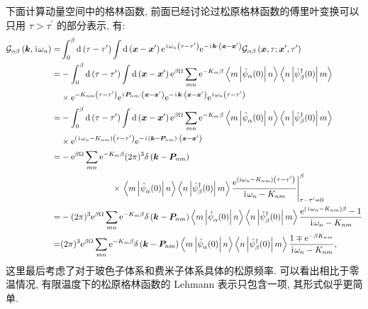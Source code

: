 下面计算动量空间中的格林函数, 前面已经讨论过松原格林函数的傅里叶变换可以只用 $\tau>\tau^{\prime}$ 的部分表示, 有:
\begin{align}
\mathcal{G}_{\alpha \beta}\left(\boldsymbol{k}, \hspace{0.1em}\mathrm{i}\hspace{0.1em} \omega_n\right)=&\int_0^\beta \mathrm{d}\left(\tau-\tau^{\prime}\right) \int \mathrm{d}\left(\boldsymbol{x}-\boldsymbol{x}^{\prime}\right)\mathrm{e}^{\hspace{0.1em}\mathrm{i}\hspace{0.1em} \omega_n\left(\tau-\tau^{\prime}\right)}  \mathrm{e}^{-\hspace{0.1em}\mathrm{i}\hspace{0.1em} \boldsymbol{k} \cdot\left(\boldsymbol{x}-\boldsymbol{x}^{\prime}\right)}\mathcal{G}_{\alpha \beta}\left(\boldsymbol{x}, \tau ; \boldsymbol{x}^{\prime}, \tau^{\prime}\right) \nonumber\\
=& -\int_0^\beta \mathrm{d}\left(\tau-\tau^{\prime}\right) \int \mathrm{d}\left(\boldsymbol{x}-\boldsymbol{x}^{\prime}\right) \mathrm{e}^{\beta \Omega} \sum_{m n} \mathrm{e}^{-K_m \beta}\left\langle m\left|\hat{\psi}_\alpha(0)\right| n\right\rangle\left\langle n\left|\hat{\psi}_\beta^{\dagger}(0)\right| m\right\rangle \nonumber\\
& \times\mathrm{e}^{-K_{n m}\left(\tau-\tau^{\prime}\right)} \mathrm{e}^{\hspace{0.1em}\mathrm{i}\hspace{0.1em} \boldsymbol{P}_{n m} \cdot\left(\boldsymbol{x}-\boldsymbol{x}^{\prime}\right)} \mathrm{e}^{-\hspace{0.1em}\mathrm{i}\hspace{0.1em} \boldsymbol{k} \cdot\left(\boldsymbol{x}-\boldsymbol{x}^{\prime}\right)} \mathrm{e}^{\hspace{0.1em}\mathrm{i}\hspace{0.1em} \omega_n\left(\tau-\tau^{\prime}\right)}\nonumber \\
= & -\int_0^\beta \mathrm{d}\left(\tau-\tau^{\prime}\right) \int \mathrm{d}\left(\boldsymbol{x}-\boldsymbol{x}^{\prime}\right) \mathrm{e}^{\beta \Omega} \sum_{m n} \mathrm{e}^{-K_m \beta}\left\langle m\left|\hat{\psi}^{}_\alpha(0)\right| n\right\rangle\left\langle n\left|\hat{\psi}_\beta^{\dagger}(0)\right| m\right\rangle \nonumber\\
&  \times\mathrm{e}^{\left(\hspace{0.1em}\mathrm{i}\hspace{0.1em} \omega_n-K_{n m}\right)\left(\tau-\tau^{\prime}\right)} \mathrm{e}^{-\hspace{0.1em}\mathrm{i}\hspace{0.1em}\left(\boldsymbol{k}-\boldsymbol{P}_{n m}\right) \cdot\left(\boldsymbol{x}-\boldsymbol{x}^{\prime}\right)} \nonumber\\
= & -\mathrm{e}^{\beta \Omega} \sum_{m n} \mathrm{e}^{-K_m \beta}(2 \pi)^3 \delta\left(\boldsymbol{k}-\boldsymbol{P}_{n m}\right)\nonumber\\
& ~~~~~~~~~~~~~~~~~~ \times\left.\left\langle m\left|\hat{\psi}^{}_\alpha(0)\right| n\right\rangle\left\langle n\left|\hat{\psi}_\beta^{\dagger}(0)\right| m\right\rangle \frac{\mathrm{e}^{\left(i \omega_n-K_{n m}\right)\left(\tau-\tau^{\prime}\right)}}{\hspace{0.1em}\mathrm{i}\hspace{0.1em} \omega_n-K_{n m}}\right|_{\tau-\tau^{\prime}=0} ^\beta\nonumber \\
= & -(2 \pi)^3 \mathrm{e}^{\beta \Omega} \sum_{m n} \mathrm{e}^{-{K}_m \beta} \delta\left(\boldsymbol{k}-\boldsymbol{P}_{n m}\right)\left\langle m\left|\hat{\psi}^{}_\alpha(0)\right| n\right\rangle\left\langle n\left|\hat{\psi}_\beta^{\dagger}(0)\right| m\right\rangle \frac{\mathrm{e}^{\left(\hspace{0.1em}\mathrm{i}\hspace{0.1em} \omega_n-K_{n m}\right) \beta}-1}{\hspace{0.1em}\mathrm{i}\hspace{0.1em} \omega_n-K_{n m}}\nonumber \\
= & (2 \pi)^3 \mathrm{e}^{\beta \Omega} \sum_{m n} \mathrm{e}^{-{K}_m \beta} \delta\left(\boldsymbol{k}-\boldsymbol{P}_{n m}\right)\left\langle m\left|\hat{\psi}^{}_\alpha(0)\right| n\right\rangle\left\langle n\left|\hat{\psi}_\beta^{\dagger}(0)\right| m\right\rangle \frac{1 \mp \mathrm{e}^{-\beta K_{n m}}}{\hspace{0.1em}\mathrm{i}\hspace{0.1em} \omega_n-K_{n m}},
\end{align}
这里最后考虑了对于玻色子体系和费米子体系具体的松原频率. 可以看出相比于零温情况, 有限温度下的松原格林函数的 Lehmann 表示只包含一项, 其形式似乎更简单. 

